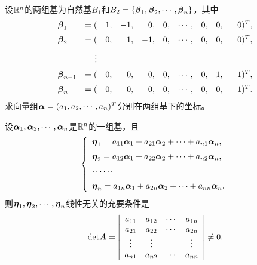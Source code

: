 \begin{frame}\ft{\subsecname}

\begin{li}
  设$\mathbb R^n$的两组基为自然基$B_1$和$B_2=\{\boldsymbol{\beta}_1,\boldsymbol{\beta}_2,\cdots,\boldsymbol{\beta}_n\}$，其中
  \begin{equation}\label{twobase}
    \begin{array}{lrrrrrrrrr}
      \boldsymbol{\beta}_1&=(&1,&-1,& 0,&0,&\cdots,&0,&0,&0)^T,\\[0.2cm]
      \boldsymbol{\beta}_2&=(&0,& 1,&-1,&0,&\cdots,&0,&0,&0)^T,\\[0.2cm]
               &\vdots&&&&&\\[0.2cm]
      \boldsymbol{\beta}_{n-1}&=(&0,&0,&0,&0,&\cdots,&0,&1,&-1)^T,\\[0.2cm]
      \boldsymbol{\beta}_{n}&=(&0,&0,&0,&0,&\cdots,&0,&0,&1)^T.
    \end{array}
  \end{equation}
  求向量组$\boldsymbol{\alpha}=(a_1,a_2,\cdots,a_n)^T$分别在两组基下的坐标。
\end{li}

\end{frame}

\begin{frame}\ft{\subsecname}


\begin{dingli}
  设$\boldsymbol{\alpha}_1,\boldsymbol{\alpha}_2,\cdots,\boldsymbol{\alpha}_n$是$\mathbb R^n$的一组基，且
  $$
  \left\{
    \begin{array}{l}
      \boldsymbol{\eta}_1=a_{11}\boldsymbol{\alpha}_1+a_{21}\boldsymbol{\alpha}_2+\cdots+a_{n1}\boldsymbol{\alpha}_n,\\[0.2cm]
      \boldsymbol{\eta}_2=a_{12}\boldsymbol{\alpha}_1+a_{22}\boldsymbol{\alpha}_2+\cdots+a_{n2}\boldsymbol{\alpha}_n,\\[0.2cm]
      \cdots\cdots\\[0.2cm]
      \boldsymbol{\eta}_n=a_{1n}\boldsymbol{\alpha}_1+a_{2n}\boldsymbol{\alpha}_2+\cdots+a_{nn}\boldsymbol{\alpha}_n.
    \end{array}
  \right.
  $$
  则$\boldsymbol{\eta}_1,\boldsymbol{\eta}_2,\cdots,\boldsymbol{\eta}_n$线性无关的充要条件是
  $$
  \mathrm{det}\boldsymbol{A}=\left|
    \begin{array}{cccc}
      a_{11}&a_{12}&\cdots&a_{1n}\\
      a_{21}&a_{22}&\cdots&a_{2n}\\
      \vdots&\vdots&&\vdots\\
      a_{n1}&a_{n2}&\cdots&a_{nn}
    \end{array}
  \right|\ne 0.
  $$
\end{dingli}
\end{frame}

